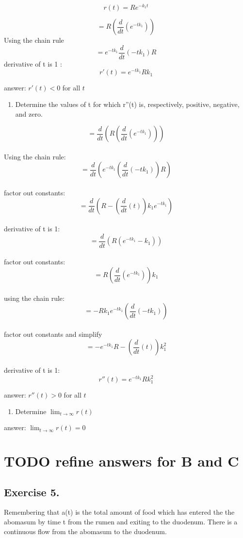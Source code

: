 \documentclass[]{article}
\providecommand{\tightlist}{%
  \setlength{\itemsep}{0pt}\setlength{\parskip}{0pt}}
\begin{document}
\[r(t) = Re^{-k_1t}\]

\[= R(\frac{d}{dt}(e^{-tk_1}))\] Using the chain rule
\[= e^{-tk_1}\frac{d}{dt}(-tk_1)R\] derivative of t is 1 :
\[r'(t)= e^{-tk_1}Rk_1\]

answer: \(r'(t) < 0\) for all \(t\)

\begin{enumerate}
\def\labelenumi{(\alph{enumi})}
\setcounter{enumi}{1}
\tightlist
\item
  Determine the values of t for which r''(t) is, respectively, positive,
  negative, and zero.
\end{enumerate}

\[= \frac{d}{dt}(R(\frac{d}{dt}(e^{-tk_1})))\]\\
Using the chain rule:
\[= \frac{d}{dt}(e^{-tk_1}(\frac{d}{dt}(-tk_1))R)\]\\
factor out constants:
\[= \frac{d}{dt}(R -(\frac{d}{dt}(t))k_1 e^{-tk_1})\]\\
derivative of t is 1: \[= \frac{d}{dt}(R(e^{-tk_1}-k_1))\]\\
factor out constants: \[= R(\frac{d}{dt}(e^{-tk_1}))k_1\]\\
using the chain rule: \[= -Rk_1e^{-tk_1}(\frac{d}{dt}(-tk_1))\]\\
factor out constants and simplify
\[= -e^{-tk_1}R-(\frac{d}{dt}(t))k_1^2\]\\
derivative of t is 1: \[r''(t)= e^{-tk_1}Rk_1^2\]

answer: \(r''(t) > 0\) for all \(t\)

\begin{enumerate}
\def\labelenumi{(\alph{enumi})}
\setcounter{enumi}{2}
\tightlist
\item
  Determine \(\lim_{t\to\infty}r(t)\)
\end{enumerate}

answer: \(\lim_{t\to\infty}r(t) =0\)

\section{TODO refine answers for B and
C}\label{todo-refine-answers-for-b-and-c}

\subsection{Exercise 5.}\label{exercise-5.}

Remembering that a(t) is the total amount of food which has entered the
the abomasum by time t from the rumen and exiting to the duodenum. There
is a continuous flow from the abomasum to the duodenum.
\end{document}

